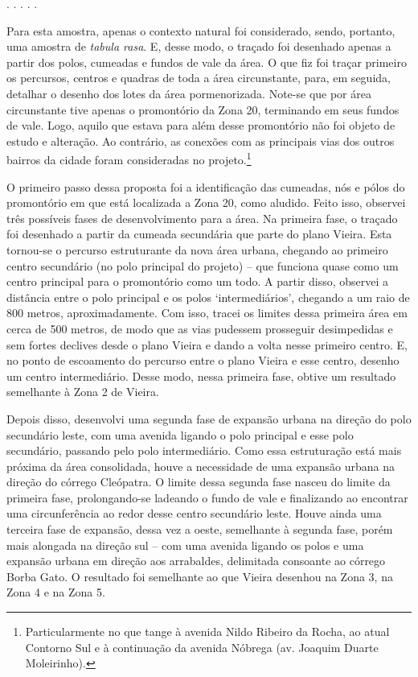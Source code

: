 \documentclass[12pt, a4paper]{book} %
\begin{document}
        \begin{center}
            . . . . .
        \end{center} 
        Para esta amostra, apenas o contexto natural foi considerado, sendo, portanto, uma amostra de \textit{tabula rasa}. E, desse modo, o traçado foi desenhado apenas a partir dos polos, cumeadas e fundos de vale da área. O que fiz foi traçar primeiro os percursos, centros e quadras de toda a área circunstante, para, em seguida, detalhar o desenho dos lotes da área pormenorizada. Note-se que por área circunstante tive apenas o promontório da Zona 20, terminando em seus fundos de vale. Logo, aquilo que estava para além desse promontório não foi objeto de estudo e alteração. Ao contrário, as conexões com as principais vias dos outros bairros da cidade foram consideradas no projeto.\footnote[29]{Particularmente no que tange à avenida Nildo Ribeiro da Rocha, ao atual Contorno Sul e à continuação da avenida Nóbrega (av. Joaquim Duarte Moleirinho).}

        O primeiro passo dessa proposta foi a identificação das cumeadas, nós e pólos do promontório em que está localizada a Zona 20, como aludido. Feito isso, observei três possíveis fases de desenvolvimento para a área. Na primeira fase, o traçado foi desenhado a partir da cumeada secundária que parte do plano Vieira. Esta tornou-se o percurso estruturante da nova área urbana, chegando ao primeiro centro secundário (no polo principal do projeto) – que funciona quase como um centro principal para o promontório como um todo. A partir disso, observei a distância entre o polo principal e os polos ‘intermediários’, chegando a um raio de 800 metros, aproximadamente. Com isso, tracei os limites dessa primeira área em cerca de 500 metros, de modo que as vias pudessem prosseguir desimpedidas e sem fortes declives desde o plano Vieira e dando a volta nesse primeiro centro. E, no ponto de escoamento do percurso entre o plano Vieira e esse centro, desenho um centro intermediário. Desse modo, nessa primeira fase, obtive um resultado semelhante à Zona 2 de Vieira.

        Depois disso, desenvolvi uma segunda fase de expansão urbana na direção do polo secundário leste, com uma avenida ligando o polo principal e esse polo secundário, passando pelo polo intermediário. Como essa estruturação está mais próxima da área consolidada, houve a necessidade de uma expansão urbana na direção do córrego Cleópatra. O limite dessa segunda fase nasceu do limite da primeira fase, prolongando-se ladeando o fundo de vale e finalizando ao encontrar uma circunferência ao redor desse centro secundário leste. Houve ainda uma terceira fase de expansão, dessa vez a oeste, semelhante à segunda fase, porém mais alongada na direção sul – com uma avenida ligando os polos e uma expansão urbana em direção aos arrabaldes, delimitada consoante ao córrego Borba Gato. O resultado foi semelhante ao que Vieira desenhou na Zona 3, na Zona 4 e na Zona 5.
\end{document}
